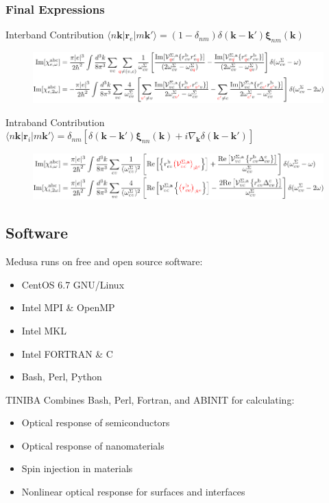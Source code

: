 \documentclass{beamer}
\begin{document}
\begin{frame}
\frametitle{Final Expressions}
\begin{block}{Interband Contribution {\tiny $\langle n\mathbf{k}| \mathbf{r}_{e} |m\mathbf{k}'\rangle = (1- \delta_{nm})\delta(\mathbf{k}-\mathbf{k}')\boldsymbol{\xi}_{nm}(\mathbf{k})$}}
\begin{figure}
\centering
\includegraphics[scale=0.70]{chis_inter_red}
\end{figure}
\end{block}
\begin{alertblock}{Intraband Contribution {\tiny $\langle n\mathbf{k}\vert \mathbf{r}_{i} |m\mathbf{k}'\rangle = \delta_{nm}\left[\delta(\mathbf{k} - \mathbf{k}')\boldsymbol{\xi}_{nn}(\mathbf{k}) + i\nabla_{\mathbf{k}}\delta(\mathbf{k} - \mathbf{k}')\right]$}}
\begin{figure}
\centering
\includegraphics[scale=0.70]{chis_intra_red}
\end{figure}
\end{alertblock}
\end{frame}

\subsection{Software}
\begin{frame}
Medusa runs on free and open source software:
\begin{itemize}
\item CentOS 6.7 GNU/Linux
\item Intel MPI \& OpenMP
\item Intel MKL
\item Intel FORTRAN \& C
\item Bash, Perl, Python
\end{itemize}
\begin{block}{TINIBA}
Combines Bash, Perl, Fortran, and ABINIT for calculating:
\begin{itemize}
\item Optical response of semiconductors
\item Optical response of nanomaterials
\item Spin injection in materials
\item Nonlinear optical response for surfaces and interfaces
\end{itemize}
\end{block}
\end{frame}
\end{document}
